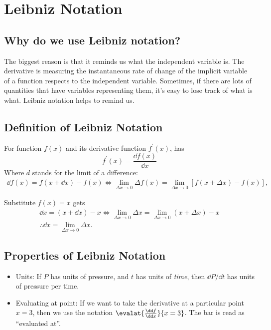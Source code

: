 \section{Leibniz Notation}
\subsection{Why do we use Leibniz notation?}
The biggest reason is that it reminds us what the independent variable is. The derivative is measuring the instantaneous rate of change of the implicit variable of a function respects to the independent variable. Sometimes, if there are lots of quantities that have variables representing them, it's easy to lose track of what is what. Leibniz notation helps to remind us.

\subsection{Definition of Leibniz Notation}
For function $f(x)$ and its derivative function $f^\prime(x)$, has
\[f^\prime(x)=\frac{\dd f(x)}{\dd x}\]
Where $d$ stands for the limit of a difference:
\begin{gather*}
\dd f(x)=f(x+\dd x)-f(x)\iff\lim_{\Delta x\to0}\Delta f(x)=\lim_{\Delta x\to0}[f(x+\Delta x)-f(x)],
\end{gather*}
\begin{corollary}[$\dd x=\svlim_{\Delta x\to0}\Delta x$]
  Substitute $f(x)=x$ gets
  \begin{gather*}
    \dd x=(x+\dd x)-x\iff\lim_{\Delta x\to0}\Delta x=\lim_{\Delta x\to0}(x+\Delta x)-x\\
    \therefore\dd x=\lim_{\Delta x\to0}\Delta x.
  \end{gather*}
\end{corollary}
\subsection{Properties of Leibniz Notation}
\begin{itemize}
\item Units: If $P$ has units of pressure, and $t$ has units of \textit{time}, then $\dd P/\dd t$ has units of pressure per time.
\item Evaluating at point: If we want to take the derivative at a particular point $x=3$, then we use the notation $\evalat{\frac{\dd f}{\dd x}}{x=3}$. The bar is read as ``evaluated at''.
\end{itemize}

